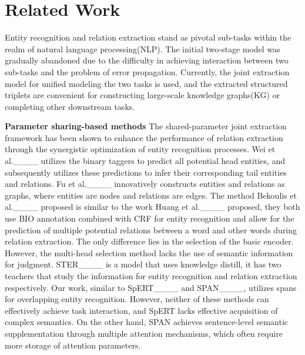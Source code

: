 \section{Related Work}
Entity recognition and relation extraction stand as pivotal sub-tasks within the realm of natural language processing(NLP). The initial two-stage model was gradually abandoned due to the difficulty in achieving interaction between two sub-tasks and the problem of error propagation. Currently, the joint extraction model for unified modeling the two tasks is used, and the extracted structured triplets are convenient for constructing large-scale knowledge graphs(KG) or completing other downstream tasks.    

\textbf{Parameter sharing-based methods} The shared-parameter joint extraction framework has been shown to enhance the performance of relation extraction through the synergistic optimization of entity recognition processes. Wei et al.____ utilizes the binary taggers to predict all potential head entities, and subsequently utilizes these predictions to infer their corresponding tail entities and relations. Fu et al.____ innovatively constructs entities and relations as graphs, where entities are nodes and relations are edges. The method Bekoulis et al.____ proposed is similar to the work Huang et al.____ proposed, they both use BIO annotation combined with CRF for entity recognition and allow for the prediction of multiple potential relations between a word and other words during relation extraction. The only difference lies in the selection of the basic encoder. However, the multi-head selection method lacks the use of semantic information for judgment. STER____ is a model that uses knowledge distill, it has two teachers that study the information for entity recognition and relation extraction respectively. Our work, similar to SpERT____ and SPAN____, utilizes spans for overlapping entity recognition. However, neither of these methods can effectively achieve task interaction, and SpERT lacks effective acquisition of complex semantics. On the other hand, SPAN achieves sentence-level semantic supplementation through multiple attention mechanisms, which often require more storage of attention parameters.

